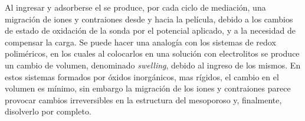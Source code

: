 		Al ingresar y adsorberse el \ru\space se produce, por cada ciclo de mediación, una migración de iones y contraiones desde y hacia la película, debido a los cambios de estado de oxidación de la sonda por el potencial aplicado, y a la necesidad de compensar la carga.  Se puede hacer una analogía con los sistemas de redox poliméricos, en los cuales al colocarlos en una solución con electrolitos se produce un cambio de volumen, denominado \textit{swelling}, debido al ingreso de los mismos\cite{Ybarra2005}. En estos sistemas formados por óxidos inorgánicos, mas rígidos, el cambio en el volumen es mínimo,\cite{Malfatti2009} sin embargo la migración de los iones y contraiones parece provocar cambios irreversibles en la estructura del mesoporoso y, finalmente, disolverlo por completo.


			



